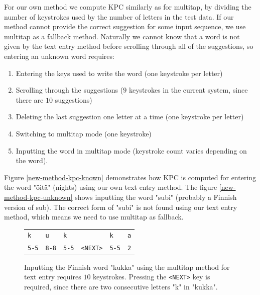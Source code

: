 \documentclass{llncs}
\begin{document}
For our own method we compute KPC similarly as for multitap, by
dividing the number of keystrokes used by the number of letters in the
test data. If our method cannot provide the correct suggestion for
some input sequence, we use multitap as a fallback method. Naturally
we cannot know that a word is not given by the text entry method
before scrolling through all of the suggestions, so entering an
unknown word requires:
\begin{enumerate}
\item Entering the keys used to write the word (one keystroke per letter)
\item Scrolling through the suggestions ($9$ keystrokes in the current system, since there are $10$ suggestions)
\item Deleting the last suggestion one letter at a time (one keystroke per letter)
\item Switching to multitap mode (one keystroke)
\item Inputting the word in multitap mode (keystroke count varies depending on the word).
\end{enumerate}

Figure \ref{new-method-kpc-known} demonstrates how KPC is computed for
entering the word "\"{o}it\"{a}" (nights) using our own text entry
method. The figure \ref{new-method-kpc-unknown} shows inputting the word "subi" (probably a
Finnish version of sub). The correct form of "subi" is not found using our text
entry method, which means we need to use multitap as fallback.

\begin{figure}[htb!]
\begin{center}
\begin{tabular}{llllll}
\texttt{k} & \texttt{u} & \texttt{k} & & \texttt{k} & \texttt{a}
\\ \texttt{5-5} & \texttt{8-8} & \texttt{5-5} & \texttt{<NEXT>} &
\texttt{5-5} & \texttt{2}
\end{tabular}
\caption{Inputting the Finnish word "kukka" using the multitap method
  for text entry requires $10$ keystrokes. Pressing the
  \texttt{<NEXT>} key is required, since there are two consecutive
  letters "k" in "kukka".}\label{kukka-kpc}
\end{center}
\end{figure}
\end{document}
